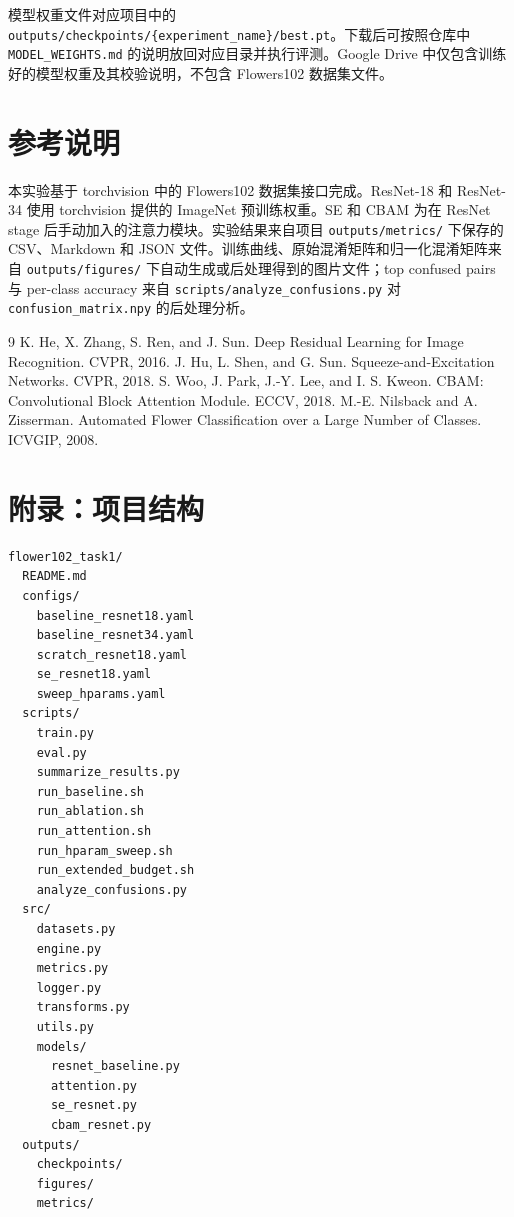 \documentclass[UTF8]{ctexart}
\begin{document}
模型权重文件对应项目中的 \verb|outputs/checkpoints/{experiment_name}/best.pt|。下载后可按照仓库中 \verb|MODEL_WEIGHTS.md| 的说明放回对应目录并执行评测。Google Drive 中仅包含训练好的模型权重及其校验说明，不包含 Flowers102 数据集文件。

\section{参考说明}
本实验基于 torchvision 中的 Flowers102 数据集接口完成。ResNet-18 和 ResNet-34 使用 torchvision 提供的 ImageNet 预训练权重。SE 和 CBAM 为在 ResNet stage 后手动加入的注意力模块。实验结果来自项目 \verb|outputs/metrics/| 下保存的 CSV、Markdown 和 JSON 文件。训练曲线、原始混淆矩阵和归一化混淆矩阵来自 \verb|outputs/figures/| 下自动生成或后处理得到的图片文件；top confused pairs 与 per-class accuracy 来自 \verb|scripts/analyze_confusions.py| 对 \verb|confusion_matrix.npy| 的后处理分析。

\begin{thebibliography}{9}
 K. He, X. Zhang, S. Ren, and J. Sun. Deep Residual Learning for Image Recognition. CVPR, 2016.
 J. Hu, L. Shen, and G. Sun. Squeeze-and-Excitation Networks. CVPR, 2018.
 S. Woo, J. Park, J.-Y. Lee, and I. S. Kweon. CBAM: Convolutional Block Attention Module. ECCV, 2018.
 M.-E. Nilsback and A. Zisserman. Automated Flower Classification over a Large Number of Classes. ICVGIP, 2008.
\end{thebibliography}

\appendix
\section{附录：项目结构}
\begin{lstlisting}
flower102_task1/
  README.md
  configs/
    baseline_resnet18.yaml
    baseline_resnet34.yaml
    scratch_resnet18.yaml
    se_resnet18.yaml
    sweep_hparams.yaml
  scripts/
    train.py
    eval.py
    summarize_results.py
    run_baseline.sh
    run_ablation.sh
    run_attention.sh
    run_hparam_sweep.sh
    run_extended_budget.sh
    analyze_confusions.py
  src/
    datasets.py
    engine.py
    metrics.py
    logger.py
    transforms.py
    utils.py
    models/
      resnet_baseline.py
      attention.py
      se_resnet.py
      cbam_resnet.py
  outputs/
    checkpoints/
    figures/
    metrics/
\end{lstlisting}
\end{document}
